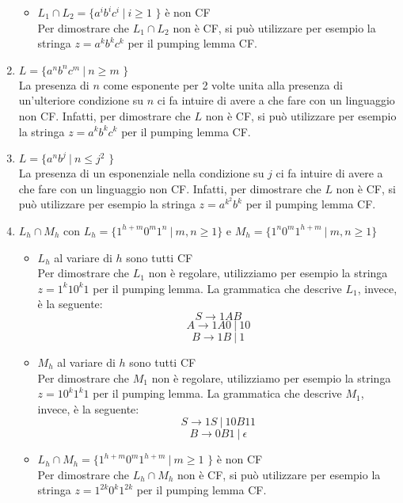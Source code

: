\documentclass[a4paper,oneside,titlepage]{book}
\begin{document}
\begin{enumerate}[label=\fbox{\arabic*}]
\begin{itemize}
\item $L_1 \cap L_2 = \text{\{ } a^i b^i c^i \ | \  i \geq 1 \text{ \}}$ è non CF
\\ Per dimostrare che $L_1 \cap L_2$ non è CF, si può utilizzare per esempio la stringa $z = a^k b^k c^k$ per il pumping lemma CF.
\end{itemize}

\item $L = \text{\{ } a^n b^n c^m \ | \  n \geq m \text{ \}}$
\\ La presenza di $n$ come esponente per 2 volte unita alla presenza di un'ulteriore condizione su $n$ ci fa intuire di avere a che fare con un linguaggio non CF. Infatti, per dimostrare che $L$ non è CF, si può utilizzare per esempio la stringa $z = a^k b^k c^k$ per il pumping lemma CF.

\item $L = \text{\{ } a^n b^j \ | \  n \leq j^2 \text{ \}}$
\\ La presenza di un esponenziale nella condizione su $j$ ci fa intuire di avere a che fare con un linguaggio non CF. Infatti, per dimostrare che $L$ non è CF, si può utilizzare per esempio la stringa $z = a^{k^2} b^k$ per il pumping lemma CF.

\item $L_h \cap M_h$ con $L_h = \{ 1^{h+m} 0^m 1^n \ | \  m,n \geq 1 \}$ e $M_h = \{ 1^n 0^m 1^{h+m} \ | \  m,n \geq 1 \}$
\begin{itemize}
\item $L_h$ al variare di $h$ sono tutti CF
\\ Per dimostrare che $L_1$ non è regolare, utilizziamo per esempio la stringa $z = 1^k 1 0^k 1$ per il pumping lemma. La grammatica che descrive $L_1$, invece, è la seguente:
\[ S \longrightarrow 1AB \]
\[ A \longrightarrow 1A0 \ | \ 10 \]
\[ B \longrightarrow 1B \ | \ 1 \]

\item $M_h$ al variare di $h$ sono tutti CF
\\ Per dimostrare che $M_1$ non è regolare, utilizziamo per esempio la stringa $z = 1 0^k 1^k 1$ per il pumping lemma. La grammatica che descrive $M_1$, invece, è la seguente:
\[ S \longrightarrow 1S \ | \ 10B11 \]
\[ B \longrightarrow 0B1 \ | \ \epsilon \]

\item $L_h \cap M_h = \text{\{ } 1^{h+m} 0^m 1^{h+m} \ | \  m \geq 1 \text{ \}}$ è non CF
\\ Per dimostrare che $L_h \cap M_h$ non è CF, si può utilizzare per esempio la stringa $z = 1^{2k} 0^k 1^{2k}$ per il pumping lemma CF.
\end{itemize}
\end{enumerate}
\end{document}
